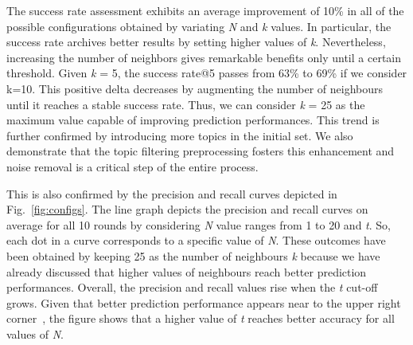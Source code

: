 The success rate assessment exhibits an average improvement of 10\% in all of the possible configurations obtained by variating \emph{N} and \emph{k} values. In particular, the success rate archives better results by setting higher values of \emph{k}. Nevertheless, increasing the number of neighbors gives remarkable benefits only until a certain threshold. Given \emph{k} = 5, the success rate@5 passes from 63\% to 69\% if we consider k=10. This positive delta decreases by augmenting the number of neighbours until it reaches a stable success rate. Thus, we can consider \emph{k} = 25 as the maximum value capable of improving prediction performances. This trend is further confirmed by introducing more topics in the initial set. We also demonstrate that the topic filtering preprocessing fosters this enhancement and noise removal is a critical step of the entire process.

This is also confirmed by the precision and recall curves depicted in Fig.~\ref{fig:configs}. 
The line graph depicts the precision and recall curves on average for all 10 rounds by considering \emph{N} value ranges from 1 to 20 and \emph{t}. So, each dot in a curve corresponds to a specific value of \emph{N}. 
These outcomes have been obtained by keeping 25 as the number of neighbours \emph{k} because we have already discussed that higher values of neighbours reach better prediction performances. Overall, the precision and recall values rise when the \emph{t} cut-off grows. Given that better prediction performance appears near to the upper right corner~\cite{DiNoia:2012:LOD:2362499.2362501}, the figure shows that a higher value of \emph{t} reaches better accuracy for all values of \emph{N}.


